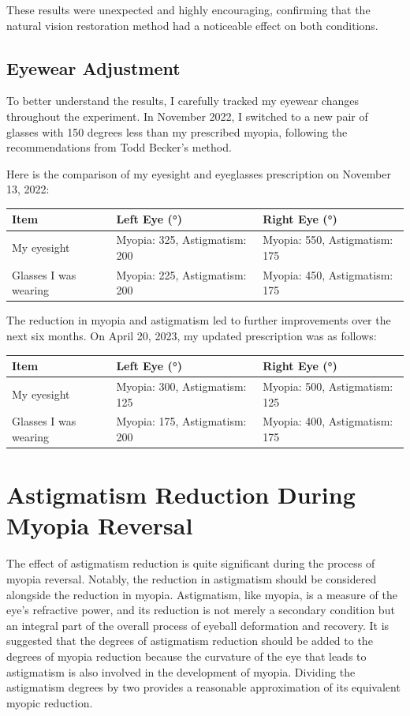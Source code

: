 \documentclass[12pt]{article}
\begin{document}
These results were unexpected and highly encouraging, confirming that the natural vision restoration method had a noticeable effect on both conditions.

\subsection{Eyewear Adjustment}
To better understand the results, I carefully tracked my eyewear changes throughout the experiment. In November 2022, I switched to a new pair of glasses with 150 degrees less than my prescribed myopia, following the recommendations from Todd Becker's method.

Here is the comparison of my eyesight and eyeglasses prescription on November 13, 2022:

\begin{table}[h!]
\centering
\begin{tabularx}{\textwidth}{|X|X|X|}
\hline
\textbf{Item} & \textbf{Left Eye (°)} & \textbf{Right Eye (°)} \\
\hline
My eyesight & Myopia: 325, Astigmatism: 200 & Myopia: 550, Astigmatism: 175 \\
Glasses I was wearing & Myopia: 225, Astigmatism: 200 & Myopia: 450, Astigmatism: 175 \\
\hline
\end{tabularx}
\end{table}

The reduction in myopia and astigmatism led to further improvements over the next six months. On April 20, 2023, my updated prescription was as follows:

\begin{table}[h!]
\centering
\begin{tabularx}{\textwidth}{|X|X|X|}
\hline
\textbf{Item} & \textbf{Left Eye (°)} & \textbf{Right Eye (°)} \\
\hline
My eyesight & Myopia: 300, Astigmatism: 125 & Myopia: 500, Astigmatism: 125 \\
Glasses I was wearing & Myopia: 175, Astigmatism: 200 & Myopia: 400, Astigmatism: 175 \\
\hline
\end{tabularx}
\end{table}

\section{Astigmatism Reduction During Myopia Reversal}
The effect of astigmatism reduction is quite significant during the process of myopia reversal. Notably, the reduction in astigmatism should be considered alongside the reduction in myopia. Astigmatism, like myopia, is a measure of the eye's refractive power, and its reduction is not merely a secondary condition but an integral part of the overall process of eyeball deformation and recovery. It is suggested that the degrees of astigmatism reduction should be added to the degrees of myopia reduction because the curvature of the eye that leads to astigmatism is also involved in the development of myopia. Dividing the astigmatism degrees by two provides a reasonable approximation of its equivalent myopic reduction.
\end{document}
